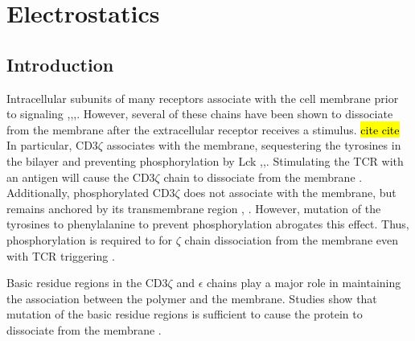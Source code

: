 \documentclass[../../AdvancementSummary.tex]{subfiles}
\begin{document}
\section{Electrostatics}

\subsection{Introduction}

Intracellular subunits of many receptors associate with the cell membrane prior to signaling \cite{Xu2008},\cite{Shi2013},\cite{Zhang2011},\cite{Dobbins2016}. 
However, several of these chains have been shown to dissociate from the membrane after the extracellular receptor receives a stimulus. \hl{cite cite} 
In particular, CD3$\zeta$ associates with the membrane, sequestering the tyrosines in the bilayer and preventing phosphorylation by Lck \cite{Aivazian2000},\cite{Zhang2011},\cite{Shi2013}.
Stimulating the TCR with an antigen will cause the CD3$\zeta$ chain to dissociate from the membrane \cite{Zhang2011}.
Additionally, phosphorylated CD3$\zeta$ does not associate with the membrane, but remains anchored by its transmembrane region  \cite{Aivazian2000}, \cite{Zhang2011}.
However, mutation of the tyrosines to phenylalanine to prevent phosphorylation abrogates this effect. Thus, phosphorylation is required to for $\zeta$ chain dissociation from the membrane even with TCR triggering  \cite{Zhang2011}.

Basic residue regions in the CD3$\zeta$ and $\epsilon$ chains play a major role in maintaining the association between the polymer and the membrane.
Studies show that mutation of the basic residue regions is sufficient to cause the protein to dissociate from the membrane \cite{Zhang2011}.
\end{document}
